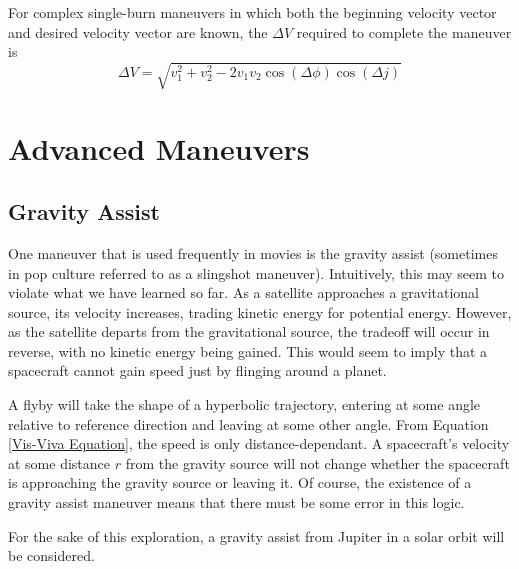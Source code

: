 \documentclass{article}
\begin{document}
\bigskip

For complex single-burn maneuvers in which both the beginning velocity vector and desired velocity vector are known, the $\Delta V$ required to complete the maneuver is
$$\Delta V = \sqrt{v_1^2+v_2^2-2v_1v_2\cos(\Delta \phi)\cos(\Delta j)}$$


\pagebreak
\section{Advanced Maneuvers}

\bigskip\bigskip
\subsection{Gravity Assist}

One maneuver that is used frequently in movies is the gravity assist (sometimes in pop culture referred to as a slingshot maneuver). Intuitively, this may seem to violate what we have learned so far. As a satellite approaches a gravitational source, its velocity increases, trading kinetic energy for potential energy. However, as the satellite departs from the gravitational source, the tradeoff will occur in reverse, with no kinetic energy being gained. This would seem to imply that a spacecraft cannot gain speed just by flinging around a planet.

A flyby will take the shape of a hyperbolic trajectory, entering at some angle relative to reference direction and leaving at some other angle. From Equation \eqref{Vis-Viva Equation}, the speed is only distance-dependant. A spacecraft's velocity at some distance $r$ from the gravity source will not change whether the spacecraft is approaching the gravity source or leaving it. Of course, the existence of a gravity assist maneuver means that there must be some error in this logic.

For the sake of this exploration, a gravity assist from Jupiter in a solar orbit will be considered.
\end{document}
